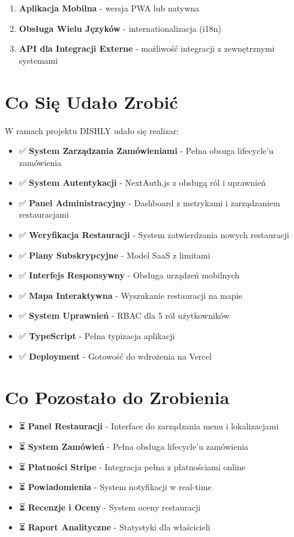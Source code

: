 ﻿\documentclass[12pt,a4paper,utf-8]{article}
\begin{document}
\begin{enumerate}
    \item \textbf{Aplikacja Mobilna}  -  wersja PWA lub natywna
    \item \textbf{Obsługa Wielu Języków}  -  internationalizacja (i18n)
    \item \textbf{API dla Integracji Externe}  -  możliwość integracji z zewnętrznymi systemami
\end{enumerate}

\section{Co Się Udało Zrobić}

W ramach projektu DISHLY udało się realizar:

\begin{itemize}
    \item ✅ \textbf{System Zarządzania Zamówieniami}  -  Pełna obsuga lifecycle'u zamówienia
    \item ✅ \textbf{System Autentykacji}  -  NextAuth.js z obsługą ról i uprawnień
    \item ✅ \textbf{Panel Administracyjny}  -  Dashboard z metrykami i zarządzaniem restauracjami
    \item ✅ \textbf{Weryfikacja Restauracji}  -  System zatwierdzania nowych restauracji
    \item ✅ \textbf{Plany Subskrypcyjne}  -  Model SaaS z limitami
    \item ✅ \textbf{Interfejs Responsywny}  -  Obsługa urządzeń mobilnych
    \item ✅ \textbf{Mapa Interaktywna}  -  Wyszukanie restauracji na mapie
    \item ✅ \textbf{System Uprawnień}  -  RBAC dla 5 ról użytkowników
    \item ✅ \textbf{TypeScript}  -  Pełna typizacja aplikacji
    \item ✅ \textbf{Deployment}  -  Gotowość do wdrożenia na Vercel
\end{itemize}

\section{Co Pozostało do Zrobienia}

\begin{itemize}
    \item ⏳ \textbf{Panel Restauracji}  -  Interface do zarządzania menu i lokalizacjami
    \item ⏳ \textbf{System Zamówień}  -  Pełna obsługa lifecycle'u zamówienia
    \item ⏳ \textbf{Płatności Stripe}  -  Integracja pełna z płatnościami online
    \item ⏳ \textbf{Powiadomienia}  -  System notyfikacji w real-time
    \item ⏳ \textbf{Recenzje i Oceny}  -  System oceny restauracji
    \item ⏳ \textbf{Raport Analityczne}  -  Statystyki dla właścicieli
\end{itemize}
\end{document}
